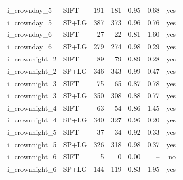 \begin{longtable}{llrrrrr}
i\_crownday\_5 & SIFT & 191 & 181 & 0.95 & 0.68 & yes \\
i\_crownday\_5 & SP+LG & 387 & 373 & 0.96 & 0.76 & yes \\
i\_crownday\_6 & SIFT & 27 & 22 & 0.81 & 1.60 & yes \\
i\_crownday\_6 & SP+LG & 279 & 274 & 0.98 & 0.29 & yes \\
i\_crownnight\_2 & SIFT & 89 & 79 & 0.89 & 0.28 & yes \\
i\_crownnight\_2 & SP+LG & 346 & 343 & 0.99 & 0.47 & yes \\
i\_crownnight\_3 & SIFT & 75 & 65 & 0.87 & 0.78 & yes \\
i\_crownnight\_3 & SP+LG & 350 & 308 & 0.88 & 0.77 & yes \\
i\_crownnight\_4 & SIFT & 63 & 54 & 0.86 & 1.45 & yes \\
i\_crownnight\_4 & SP+LG & 340 & 327 & 0.96 & 0.20 & yes \\
i\_crownnight\_5 & SIFT & 37 & 34 & 0.92 & 0.33 & yes \\
i\_crownnight\_5 & SP+LG & 326 & 318 & 0.98 & 0.37 & yes \\
i\_crownnight\_6 & SIFT & 5 & 0 & 0.00 & -- & no \\
i\_crownnight\_6 & SP+LG & 144 & 119 & 0.83 & 1.95 & yes \\
\end{longtable}\endgroup
